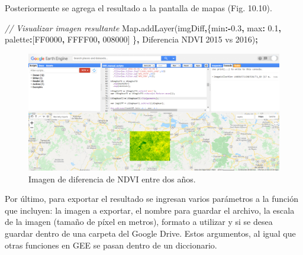 \documentclass[
  12pt,
  letterpaper,
  twoside]{book}
\newenvironment{Shaded}{\begin{snugshade}}{\end{snugshade}}
\newcommand{\BuiltInTok}[1]{#1}
\newcommand{\CommentTok}[1]{\textcolor[rgb]{0.56,0.35,0.01}{\textit{#1}}}
\newcommand{\DataTypeTok}[1]{\textcolor[rgb]{0.13,0.29,0.53}{#1}}
\newcommand{\FloatTok}[1]{\textcolor[rgb]{0.00,0.00,0.81}{#1}}
\newcommand{\FunctionTok}[1]{\textcolor[rgb]{0.00,0.00,0.00}{#1}}
\newcommand{\NormalTok}[1]{#1}
\newcommand{\OperatorTok}[1]{\textcolor[rgb]{0.81,0.36,0.00}{\textbf{#1}}}
\newcommand{\StringTok}[1]{\textcolor[rgb]{0.31,0.60,0.02}{#1}}
\begin{document}
Posteriormente se agrega el resultado a la pantalla de mapas (Fig. 10.10).

\begin{Shaded}
\begin{Highlighting}[]
\CommentTok{// Visualizar imagen resultante}
\BuiltInTok{Map}\OperatorTok{.}\FunctionTok{addLayer}\NormalTok{(imgDiff}\OperatorTok{,}\NormalTok{\{}\DataTypeTok{min}\OperatorTok{:{-}}\FloatTok{0.3}\OperatorTok{,} \DataTypeTok{max}\OperatorTok{:} \FloatTok{0.1}\OperatorTok{,} 
  \DataTypeTok{palette}\OperatorTok{:}\NormalTok{[}\StringTok{\textquotesingle{}FF0000\textquotesingle{}}\OperatorTok{,} \StringTok{\textquotesingle{}FFFF00\textquotesingle{}}\OperatorTok{,} \StringTok{\textquotesingle{}008000\textquotesingle{}}\NormalTok{] \}}\OperatorTok{,} 
  \StringTok{\textquotesingle{}Diferencia NDVI 2015 vs 2016\textquotesingle{}}\NormalTok{)}\OperatorTok{;}
\end{Highlighting}
\end{Shaded}

\begin{figure}[btp]

{\centering \includegraphics[width=1\linewidth]{Img/imDifNDVI} 

}

\caption{Imagen de diferencia de NDVI entre dos años.}\label{fig:unnamed-chunk-180}
\end{figure}

Por último, para exportar el resultado se ingresan varios parámetros a la función que incluyen: la imagen a exportar, el nombre para guardar el archivo, la escala de la imagen (tamaño de píxel en metros), formato a utilizar y si se desea guardar dentro de una carpeta del Google Drive. Estos argumentos, al igual que otras funciones en GEE se pasan dentro de un diccionario.
\end{document}
